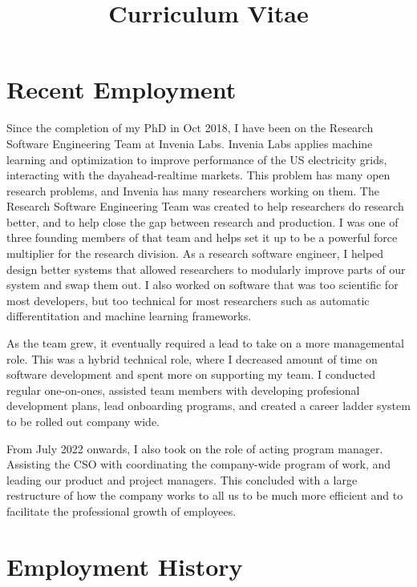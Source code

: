 \documentclass[11pt,a4paper,sans]{moderncv}
\title{Curriculum Vitae}
\begin{document}
\makecvtitle

\section{Recent Employment}
Since the completion of my PhD in Oct 2018, I have been on the Research Software Engineering Team at Invenia Labs.
Invenia Labs applies machine learning and optimization to improve performance of the US electricity grids, interacting with the dayahead-realtime markets.
This problem has many open research problems, and Invenia has many researchers working on them.
The Research Software Engineering Team was  created to help researchers do research better, and to help close the gap between research and production.
I was one of three founding members of that team and helps set it up to be a powerful force multiplier for the research division.
As a research software engineer, I helped design better systems that allowed researchers to modularly improve parts of our system and swap them out.
I also worked on software that was too scientific for most developers, but too technical for most researchers such as automatic differentitation and machine learning frameworks.

As the team grew, it eventually required a lead to take on a more managemental role.
This was a hybrid technical role, where I decreased amount of time on software development and spent more on supporting my team.
I conducted regular one-on-ones, assisted team members with developing profesional development plans, lead onboarding programs, and created a career ladder system to be rolled out company wide.

From July 2022 onwards, I also took on the role of acting program manager.
Assisting the CSO with coordinating the company-wide program of work, and leading our product and project managers.
This concluded with a large restructure of how the company works to all us to be much more efficient and to facilitate the professional growth of employees.

\section{Employment History}
\end{document}
